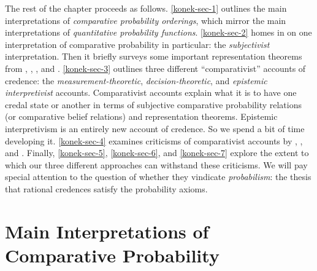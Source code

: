 The rest of the chapter proceeds as follows. \autoref{konek-sec-1} outlines the main interpretations of \emph{comparative probability orderings}, which mirror the main interpretations of \emph{quantitative probability functions}. \autoref{konek-sec-2} homes in on one interpretation of comparative probability in particular: the \emph{subjectivist} interpretation. Then it briefly surveys some important representation theorems from \citet{Kraft1959}, \citet{Scott1964}, \citet{Suppes1976}, and \citet{Alon2014}. \autoref{konek-sec-3} outlines three different ``comparativist'' accounts of credence: the \textit{measurement-theoretic}, \textit{decision-theoretic}, and \textit{epistemic interpretivist} accounts. Comparativist accounts explain what it is to have one credal state or another in terms of subjective comparative probability relations (or comparative belief relations) and representation theorems. Epistemic interpretivism is an entirely new account of credence. So we spend a bit of time developing it. \autoref{konek-sec-4} examines criticisms of comparativist accounts by \citet{Hajek2009b}, \citet{Meacham2011}, and \citet{Titelbaum2015}. Finally, \autoref{konek-sec-5}, \autoref{konek-sec-6}, and \autoref{konek-sec-7} explore the extent to which our three different approaches can withstand these criticisms. We will pay special attention to the question of whether they vindicate \emph{probabilism}: the thesis that rational credences satisfy the probability axioms. 




\section{Main Interpretations of Comparative Probability}\label{konek-sec-1}



